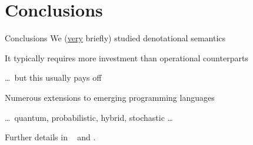 \documentclass{beamer}
\begin{document}
\section{Conclusions}

\begin{frame}{Conclusions}
        We (\alert{\underline{very}} briefly) studied denotational semantics

        It typically requires more investment than operational counterparts

        \dots \, but this usually pays off

        Numerous extensions to emerging programming languages

        \dots \, quantum, probabilistic, hybrid, stochastic \dots

        \vfill
        Further details in \eg\ \cite[Chapter 2]{reynolds98} and \cite[Chapter
        5]{winskel93}.
\end{frame}



\end{document}
